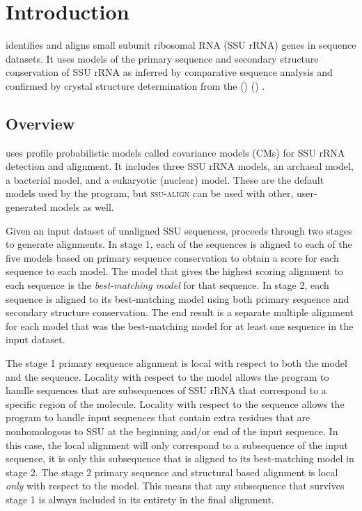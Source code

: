 \section{Introduction}

 identifies and aligns small subunit ribosomal RNA
(SSU rRNA) genes in sequence datasets. It uses models of the primary
sequence and secondary structure conservation of SSU rRNA as inferred
by comparative sequence analysis and confirmed by crystal structure
determination from the  () 
()
\cite{CannoneGutell02}.

\subsection{Overview}
 uses profile probabilistic models called
covariance models (CMs) for SSU rRNA detection and alignment. It
includes three SSU rRNA models, an archaeal model, a bacterial model,
and a eukaryotic (nuclear) model.  These are the default models used
by the program, but \textsc{ssu-align} can be used with other,
user-generated models as well.

Given an input dataset of unaligned SSU sequences,
 proceeds through two stages to generate
alignments. In stage 1, each of the sequences is aligned to
each of the five models based on primary sequence conservation to
obtain a score for each sequence to each model.  The model that gives
the highest scoring alignment to each sequence is the
\emph{best-matching model} for that sequence.  In stage 2, each
sequence is aligned to its best-matching model using both primary
sequence and secondary structure conservation. The end result is a
separate multiple alignment for each model that was the best-matching
model for at least one sequence in the input dataset.

The stage 1 primary sequence alignment is local with respect to both
the model and the sequence. Locality with respect to the model allows
the program to handle sequences that are subsequences of SSU
rRNA that correspond to a specific region of the molecule. Locality
with respect to the sequence allows the program to handle input
sequences that contain extra residues that are nonhomologous to SSU at
the beginning and/or end of the input sequence. In this case, the
local alignment will only correspond to a subsequence of the input
sequence, it is only this subsequence that is aligned to its
best-matching model in stage 2.
The stage 2 primary sequence and structural based alignment is local
\emph{only} with respect to the model.  This means that any subsequence
that survives stage 1 is always included in its entirety in the final
alignment.

